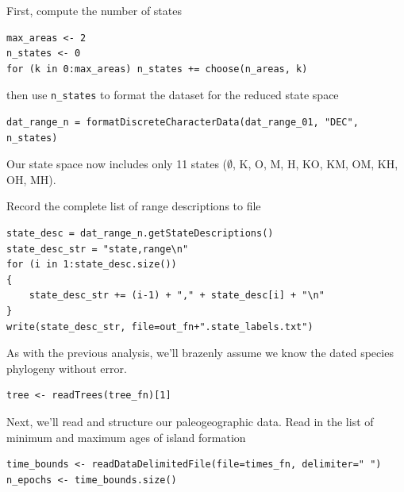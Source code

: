 First, compute the number of states

\begin{snugshade}
\begin{lstlisting}
max_areas <- 2
n_states <- 0
for (k in 0:max_areas) n_states += choose(n_areas, k)
\end{lstlisting}
\end{snugshade}

then use {\tt n\_states} to format the dataset for the reduced state space

\begin{snugshade}
\begin{lstlisting}
dat_range_n = formatDiscreteCharacterData(dat_range_01, "DEC", n_states)
\end{lstlisting}
\end{snugshade}

Our state space now includes only 11 states ($\emptyset$, K, O, M, H, KO, KM, OM, KH, OH, MH).

Record the complete list of range descriptions to file

\begin{snugshade}
\begin{lstlisting}
state_desc = dat_range_n.getStateDescriptions()
state_desc_str = "state,range\n"
for (i in 1:state_desc.size())
{
    state_desc_str += (i-1) + "," + state_desc[i] + "\n"
}
write(state_desc_str, file=out_fn+".state_labels.txt")
\end{lstlisting}
\end{snugshade}


As with the previous analysis, we'll brazenly assume we know the dated species phylogeny without error.

\begin{snugshade}
\begin{lstlisting}
tree <- readTrees(tree_fn)[1]
\end{lstlisting}
\end{snugshade}

Next, we'll read and structure our paleogeographic data.
Read in the list of minimum and maximum ages of island formation

\begin{snugshade}
\begin{lstlisting}
time_bounds <- readDataDelimitedFile(file=times_fn, delimiter=" ")
n_epochs <- time_bounds.size()
\end{lstlisting}
\end{snugshade}

